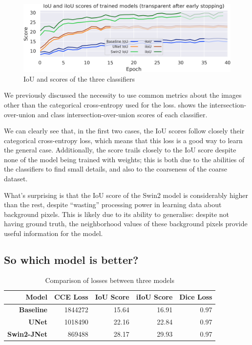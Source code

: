 \begin{figure}[h]
	\centering
	\includegraphics[width=.8\textwidth]{iou_scores.png}
	\caption{IoU and \iiouc{} scores of the three classifiers}
	\label{comparisons}
\end{figure}

We previously discussed the necessity to use common metrics about the images other than the categorical cross-entropy used for the loss.
 shows the intersection-over-union and class intersection-over-union scores of each classifier.


We can clearly see that, in the first two cases, the IoU scores follow closely their categorical cross-entropy loss, which means that this loss is a good way to learn the general case.
Additionally, the \iiouc{} score trails closely to the IoU score despite none of the model being trained with weights; this is both due to the abilities of the classifiers to find small details, and also to the coarseness of the coarse dataset.

What's surprising is that the IoU score of the Swin2 model is considerably higher than the rest, despite ``wasting'' processing power in learning data about background pixels.
This is likely due to its ability to generalise: despite not having ground truth, the neighborhood values of these background pixels provide useful information for the model.

\subsection{So which model is better?}

\begin{table}[h]
	\centering
	\begin{tabular}{>{\bfseries}r | r r r r}
		\toprule
		Model & CCE Loss & IoU Score & iIoU Score & Dice Loss \\
		\midrule
		Baseline & \num{1844272} & 15.64 & 16.91 & 0.97 \\
		UNet & \num{1018490} & 22.16 & 22.84 & 0.97 \\
		Swin2-JNet & \num{869488} & 28.17 & 29.93 & 0.97 \\
		\bottomrule
	\end{tabular}
	\caption{Comparison of losses between three models}
	\label{result_scores}
\end{table}

